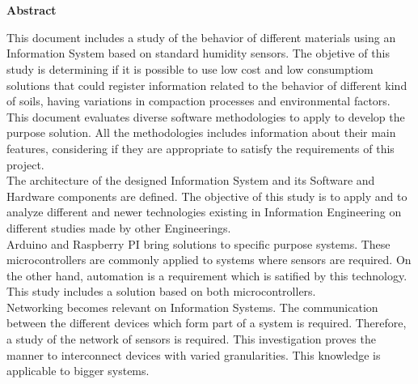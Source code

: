 

\newpage


\chapter*{}
\begin{center}
\textbf{Abstract}
\end{center}

This document includes a study of the behavior of different materials using an Information System based on standard humidity sensors. The objetive of this study is determining if it is possible to use low cost and low consumptiom solutions that could register information related to the behavior of different kind of soils, having variations in compaction processes and environmental factors.\\

This document evaluates diverse software methodologies to apply to develop the purpose solution. All the methodologies includes information about their main features, considering if they are appropriate to satisfy the requirements of this project.\\

The architecture of the designed Information System and its Software and Hardware components are defined. The objective of this study is to apply and to analyze different and newer technologies existing in Information Engineering on different studies made by other Engineerings.\\

Arduino and Raspberry PI bring solutions to specific purpose systems. These microcontrollers are commonly applied to systems where sensors are required. On the other hand, automation is a requirement which is satified by this technology. This study includes a solution based on both microcontrollers.\\

Networking becomes relevant on Information Systems. The communication between the different devices which form part of a system is required. Therefore, a study of the network of sensors is required. This investigation proves the manner to interconnect devices with varied granularities. This knowledge is applicable to bigger systems.\\

